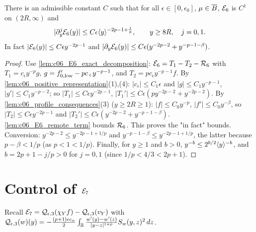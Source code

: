 \begin{proposition}[Control of $\mc E_6$]
  \label{prop:approx_E6}
  There is an admissible constant $C$ such that for all $\epsilon\in[0,\epsilon_0]$, $\mu\in\overline{B}$,
  $\mc E_6$ is $C^1$ on $(2R,\infty)$ and
  \[|\partial_y^j\mathcal{E}_6(y)|\le C\epsilon\langle y \rangle^{-2p-1+\frac jp},\qquad y\geq 8R,\quad j=0,1.\]
  In fact $|\mathcal{E}_6(y)|\le C\epsilon y^{-2p-1}$ and $|\partial_y\mathcal{E}_6(y)|\le C\epsilon(y^{-2p-2}+y^{-p-1-\beta})$.
\end{proposition}
\begin{proof}
  Use \cref{lem:c06_E6_exact_decomposition}: $\mathcal{E}_6=T_1-T_2-\mathcal{R}_6$ with
  $T_1=c_\epsilon y^{-p}g$, $g=f_{0,\textup{low}}'-pc_+y^{-p-1}$, and $T_2=pc_\epsilon y^{-p-1}f$.
  By \cref{lem:c06_positive_representation}(1),(4): $|c_\epsilon|\le C_1\epsilon$ and $|g|\le C_1y^{-p-1}$, $|g'|\le C_1y^{-p-2}$;
  so $|T_1|\le C\epsilon y^{-2p-1}$, $|T_1'|\le C\epsilon(py^{-2p-2}+y^{-2p-2})$.
  By \cref{lem:c06_profile_consequences}(3) ($y\ge2R\ge1$): $|f|\le C_0y^{-p}$, $|f'|\le C_0y^{-\beta}$, so
  $|T_2|\le C\epsilon y^{-2p-1}$ and $|T_2'|\le C\epsilon(y^{-2p-2}+y^{-p-1-\beta})$.
  \cref{lem:c06_E6_remote_term} bounds $\mathcal{R}_6$. This proves the "in fact" bounds.
  Conversion: $y^{-2p-2}\le y^{-2p-1+1/p}$ and $y^{-p-1-\beta}\le y^{-2p-1+1/p}$, the latter because
  $p-\beta<1/p$ (as $p<1<1/p$). Finally, for $y\ge1$ and $b>0$, $y^{-b}\le 2^{b/2}\langle y \rangle^{-b}$, and
  $b=2p+1-j/p>0$ for $j=0,1$ (since $1/p<4/3<2p+1$).
\end{proof}

\section{Control of $\mathcal{E}_7$}

Recall $\mathcal{E}_7=\mathcal{Q}_{\epsilon,3}(\chi_Yf)-\mathcal{Q}_{\epsilon,3}(v_Y)$ with
$\mathcal{Q}_{\epsilon,3}(w)(y)=-\frac{(p+1)\epsilon c_\alpha}{2}\int_{\mathbb{R}}\frac{w'(y)-w'(z)}{|y-z|^{1+p}}S_w(y,z)^2\,dz$.

